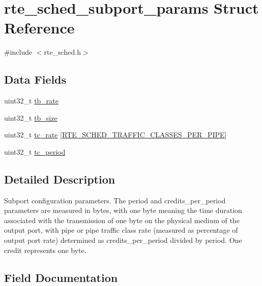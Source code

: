 \hypertarget{structrte__sched__subport__params}{}\section{rte\+\_\+sched\+\_\+subport\+\_\+params Struct Reference}
\label{structrte__sched__subport__params}


{\ttfamily \#include $<$rte\+\_\+sched.\+h$>$}

\subsection*{Data Fields}
\begin{DoxyCompactItemize}
\item 
uint32\+\_\+t \hyperlink{structrte__sched__subport__params_aa64063ce773f9f838ade073d6165dfe5}{tb\+\_\+rate}
\item 
uint32\+\_\+t \hyperlink{structrte__sched__subport__params_a195cebdb412ff2ca5b671188f11efec3}{tb\+\_\+size}
\item 
uint32\+\_\+t \hyperlink{structrte__sched__subport__params_a2cf879b3b3815b594057ba4dfcbb13bb}{tc\+\_\+rate} \mbox{[}\hyperlink{rte__sched_8h_a987eaedb9cd05abdbdb1bf30ed446ac1}{R\+T\+E\+\_\+\+S\+C\+H\+E\+D\+\_\+\+T\+R\+A\+F\+F\+I\+C\+\_\+\+C\+L\+A\+S\+S\+E\+S\+\_\+\+P\+E\+R\+\_\+\+P\+I\+P\+E}\mbox{]}
\item 
uint32\+\_\+t \hyperlink{structrte__sched__subport__params_a9c10b3eb86bcd8d9db80b934a4340e5d}{tc\+\_\+period}
\end{DoxyCompactItemize}


\subsection{Detailed Description}
Subport configuration parameters. The period and credits\+\_\+per\+\_\+period parameters are measured in bytes, with one byte meaning the time duration associated with the transmission of one byte on the physical medium of the output port, with pipe or pipe traffic class rate (measured as percentage of output port rate) determined as credits\+\_\+per\+\_\+period divided by period. One credit represents one byte. 

\subsection{Field Documentation}
\hypertarget{structrte__sched__subport__params_aa64063ce773f9f838ade073d6165dfe5}{}
